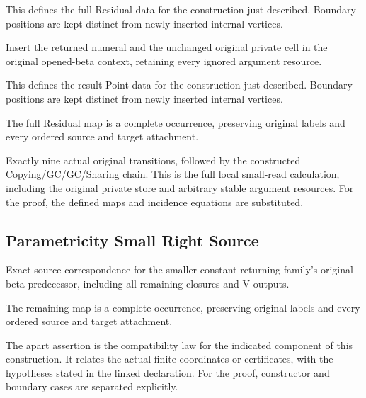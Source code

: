 This defines the full Residual data for the construction just described. Boundary positions are kept distinct from newly inserted internal vertices.
\par{}

Insert the returned numeral and the unchanged original private cell in the original opened-beta context, retaining every ignored argument resource.
\par{}

This defines the result Point data for the construction just described. Boundary positions are kept distinct from newly inserted internal vertices.
\par{}

The full Residual map is a complete occurrence, preserving original labels and every ordered source and target attachment.
\par{}

Exactly nine actual original transitions, followed by the constructed Copying/GC/GC/Sharing chain. This is the full local small-read calculation, including the original private store and arbitrary stable argument resources.
For the proof, the defined maps and incidence equations are substituted.
\par{}

\subsection{Parametricity Small Right Source}
Exact source correspondence for the smaller constant-returning family's original beta predecessor, including all remaining closures and V outputs.

The remaining map is a complete occurrence, preserving original labels and every ordered source and target attachment.
\par{}

The apart assertion is the compatibility law for the indicated component of this construction. It relates the actual finite coordinates or certificates, with the hypotheses stated in the linked declaration.
For the proof, constructor and boundary cases are separated explicitly.
\par{}

